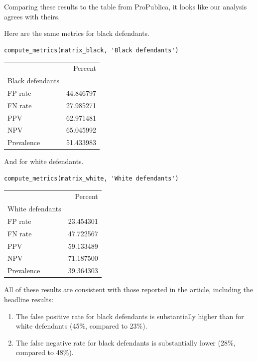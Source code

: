 Comparing these results to the table from ProPublica, it looks like our
analysis agrees with theirs.

Here are the same metrics for black defendants.

\begin{lstlisting}[]
compute_metrics(matrix_black, 'Black defendants')
\end{lstlisting}

\begin{tabular}{lr}
\midrule
{} &    Percent \\
Black defendants &            \\
\midrule
FP rate          &  44.846797 \\
FN rate          &  27.985271 \\
PPV              &  62.971481 \\
NPV              &  65.045992 \\
Prevalence       &  51.433983 \\
\midrule
\end{tabular}

And for white defendants.

\begin{lstlisting}[]
compute_metrics(matrix_white, 'White defendants')
\end{lstlisting}

\begin{tabular}{lr}
\midrule
{} &    Percent \\
White defendants &            \\
\midrule
FP rate          &  23.454301 \\
FN rate          &  47.722567 \\
PPV              &  59.133489 \\
NPV              &  71.187500 \\
Prevalence       &  39.364303 \\
\midrule
\end{tabular}

All of these results are consistent with those reported in the article,
including the headline results:

\begin{enumerate}
\def\labelenumi{\arabic{enumi}.}
\item
  The false positive rate for black defendants is substantially higher
  than for white defendants (45\%, compared to 23\%).
\item
  The false negative rate for black defendants is substantially lower
  (28\%, compared to 48\%).
\end{enumerate}

